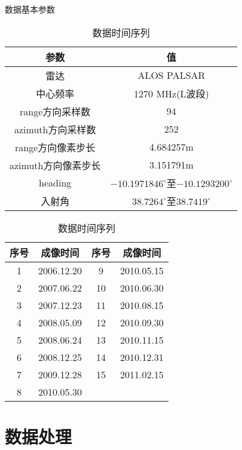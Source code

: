 \begin{table}
    \centering\small
    \begin{minipage}{0.8\textwidth}
        \centering\small
    \caption{数据基本参数}
    \label{tab:palsar}
    \begin{tabular}{@{}cc@{}}
    \toprule
    参数           & 值 \\ 
    \midrule
    雷达           & ALOS PALSAR  \\
    中心频率         & 1270 MHz(L波段) \\
    range方向采样数   & 94  \\
    azimuth方向采样数 & 252  \\
    range方向像素步长 & 4.684257m \\
    azimuth方向像素步长 & 3.151791m \\
    heading      & $-10.1971846^{\circ}$至$-10.1293200^{\circ}$ \\
    入射角          & $38.7264^{\circ}$至$38.7419^{\circ}$  \\
    \bottomrule
    \end{tabular}
    \end{minipage}
    \begin{minipage}{0.8\textwidth}
        \centering\small
        \caption{数据时间序列}
        \label{tab:timeseries}
        \begin{tabular}{@{}cccc@{}}
        \toprule
        序号 & 成像时间 & 序号 & 成像时间\\ 
        \midrule
        1 & 2006.12.20 & 9 & 2010.05.15 \\
        2 & 2007.06.22 & 10 & 2010.06.30 \\
        3 & 2007.12.23 & 11 & 2010.08.15 \\
        4 & 2008.05.09 & 12 & 2010.09.30 \\
        5 & 2008.06.24 & 13 & 2010.11.15 \\
        6 & 2008.12.25 & 14 & 2010.12.31 \\
        7 & 2009.12.28 & 15 & 2011.02.15 \\
        8 & 2010.05.30 & & \\
        \bottomrule
        \end{tabular}   
    \end{minipage}
\end{table}

\section{数据处理}

